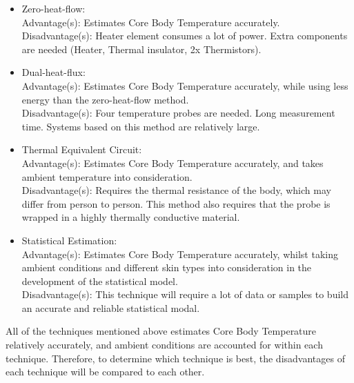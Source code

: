 \begin{itemize}
    \item Zero-heat-flow:\\
    Advantage(s): Estimates Core Body Temperature accurately.\\
    Disadvantage(s):  Heater element consumes a lot of power. Extra components are needed (Heater, Thermal insulator, 2x Thermistors).
    
    \item Dual-heat-flux:\\
    Advantage(s): Estimates Core Body Temperature accurately, while using less energy than the zero-heat-flow method.\\
    Disadvantage(s): Four temperature probes are needed. Long measurement time. Systems based on this method are relatively large.
    
    \item Thermal Equivalent Circuit:\\
    Advantage(s): Estimates Core Body Temperature accurately, and takes ambient temperature into consideration. \\
    Disadvantage(s): Requires the thermal resistance of the body, which may differ from person to person. This method also requires that the probe is wrapped in a highly thermally conductive material.
    
    \item Statistical Estimation:\\
    Advantage(s): Estimates Core Body Temperature accurately, whilst taking ambient conditions and different skin types into consideration in the development of the statistical model. \\
    Disadvantage(s): This technique will require a lot of data or samples to build an accurate and reliable statistical modal.
\end{itemize}
\noindent
All of the techniques mentioned above estimates Core Body Temperature relatively accurately, and ambient conditions are accounted for within each technique. Therefore, to determine which technique is best, the disadvantages of each technique will be compared to each other. 
\\
\\
